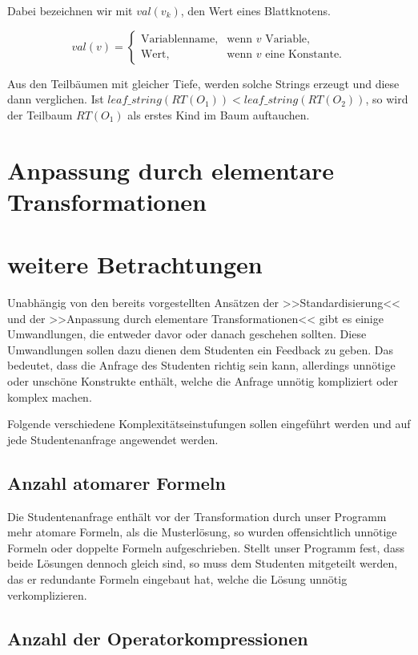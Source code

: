 Dabei bezeichnen wir mit $\mathit{val}(v_k)$, den Wert eines Blattknotens.

$$
val(v)=\begin{cases}
  \text{Variablenname},  & \text{wenn }v\text{ Variable,}\\
  \text{Wert}, & \text{wenn }v\text{ eine Konstante.}
\end{cases}
$$

Aus den Teilbäumen mit gleicher Tiefe, werden solche Strings erzeugt und diese dann verglichen.
Ist $\mathit{leaf\_string}(RT(O_1)) <  \mathit{leaf\_string}(RT(O_2))$, so wird der Teilbaum $RT(O_1)$ als erstes Kind im Baum auftauchen.


\section{Anpassung durch elementare Transformationen}

\section{weitere Betrachtungen}

Unabhängig von den bereits vorgestellten Ansätzen der >>Standardisierung<< und der >>Anpassung durch elementare Transformationen<< gibt es einige Umwandlungen, die entweder davor oder danach geschehen sollten. Diese Umwandlungen sollen dazu dienen dem Studenten ein Feedback zu geben. Das bedeutet, dass die Anfrage des Studenten richtig sein kann, allerdings unnötige oder unschöne Konstrukte enthält, welche die Anfrage unnötig kompliziert oder komplex machen.

Folgende verschiedene Komplexitätseinstufungen sollen eingeführt werden und auf jede Studentenanfrage angewendet werden.

\subsection{Anzahl atomarer Formeln}

Die Studentenanfrage enthält vor der Transformation durch unser Programm mehr atomare Formeln, als die Musterlösung, so wurden offensichtlich unnötige Formeln oder doppelte Formeln aufgeschrieben. Stellt unser Programm fest, dass beide Lösungen dennoch gleich sind, so muss dem Studenten mitgeteilt werden, das er redundante Formeln eingebaut hat, welche die Lösung unnötig verkomplizieren. 

\subsection{Anzahl der Operatorkompressionen}

